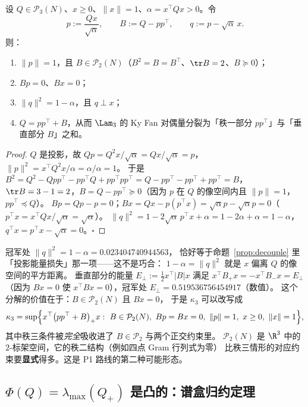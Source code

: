 \begin{lemma}[垂直二标架分解，已证]\label{lem:perp2}
设 $Q\in\mathcal P_3(N)$、$x\ge0$、$\|x\|=1$、$\alpha=x^\top Qx>0$。令
\[
p:=\frac{Qx}{\sqrt\alpha},\qquad B:=Q-pp^\top,\qquad q:=p-\sqrt\alpha\,x .
\]
则：
\begin{enumerate}[label=(\roman*),leftmargin=2.2em]
\item $\|p\|=1$，且 $B\in\mathcal P_2(N)$（$B^2=B=B^\top$、$\tr B=2$、$B\succeq0$）；
\item $Bp=0$、$Bx=0$；
\item $\|q\|^2=1-\alpha$，且 $q\perp x$；
\item $Q=pp^\top+B$，从而 $\Lam_3$ 的 Ky Fan 对偶量分裂为「秩一部分 $pp^\top$」与「垂直部分 $B$」之和。
\end{enumerate}
\end{lemma}

\begin{proof}
$Q$ 是投影，故 $Qp=Q^2x/\sqrt\alpha=Qx/\sqrt\alpha=p$，$\|p\|^2=x^\top Q^2x/\alpha=\alpha/\alpha=1$。
于是 $B^2=Q^2-Qpp^\top-pp^\top Q+pp^\top pp^\top=Q-pp^\top-pp^\top+pp^\top=B$，
$\tr B=3-1=2$，$B=Q-pp^\top\succeq0$（因为 $p$ 在 $Q$ 的像空间内且 $\|p\|=1$，$pp^\top\preceq Q$）。
$Bp=Qp-p=0$；$Bx=Qx-p(p^\top x)=\sqrt\alpha p-\sqrt\alpha p=0$（$p^\top x=x^\top Qx/\sqrt\alpha=\sqrt\alpha$）。
$\|q\|^2=1-2\sqrt\alpha\,p^\top x+\alpha=1-2\alpha+\alpha=1-\alpha$，$q^\top x=p^\top x-\sqrt\alpha=0$。$\square$
\end{proof}

\begin{remark}[冠军处的分裂，精确/数值]\label{rmk:perp2read}
冠军处 $\|q\|^2=1-\alpha=0.023404740944563$，
恰好等于命题~\ref{prop:decouple} 里「投影能量损失」那一项——这不是巧合：
$1-\alpha=\|q\|^2$ 就是 $x$ 偏离 $Q$ 的像空间的平方距离。
垂直部分的能量 $E_\perp:=\tfrac12x^\top|B|x$ 满足 $x^\top B_+x=-x^\top B_-x=E_\perp$
（因为 $Bx=0$ 使 $x^\top Bx=0$），冠军处 $E_\perp=0.519536756454917$（数值）。
这个分解的价值在于：$B\in\mathcal P_2(N)$ 且 $Bx=0$，
于是 $\kappa_3$ 可以改写成
\[
\kappa_3=\sup\Bigl\{x^\top\bigl(pp^\top+B\bigr)_+x:\ B\in\mathcal P_2(N),\ Bp=Bx=0,\ \|p\|=1,\ x\ge0,\ \|x\|=1\Bigr\},
\]
其中秩三条件被\emph{完全}吸收进了 $B\in\mathcal P_2$ 与两个正交约束里。
$\mathcal P_2(N)$ 是 $\R^3$ 中的 $2$-标架空间，它的秩二结构（例如四点 Gram 行列式为零）
比秩三情形的对应约束要\textbf{显式}得多。这是 P1 路线的第二种可能形态。
\end{remark}

\subsection{$\Phi(Q)=\lambda_{\max}(Q_+)$ 是凸的：谱盒归约定理}\label{sec:convex}

